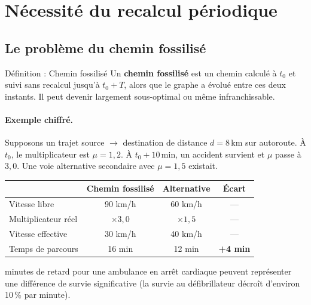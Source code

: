 \documentclass[12pt,a4paper]{article}
\theoremstyle{definition}
\theoremstyle{remark}
\begin{document}
\section{Nécessité du recalcul périodique}

\subsection{Le problème du chemin fossilisé}

\begin{defbox}{Définition : Chemin fossilisé}
  Un \textbf{chemin fossilisé} est un chemin calculé à $t_0$ et suivi
  sans recalcul jusqu'à $t_0 + T$, alors que le graphe a évolué entre
  ces deux instants. Il peut devenir largement sous-optimal ou même
  infranchissable.
\end{defbox}

\paragraph{Exemple chiffré.}
Supposons un trajet source $\to$ destination de distance $d = 8$\,km
sur autoroute. À $t_0$, le multiplicateur est $\mu = 1{,}2$.
À $t_0 + 10$\,min, un accident survient et $\mu$ passe à $3{,}0$.
Une voie alternative secondaire avec $\mu = 1{,}5$ existait.

\begin{center}
\begin{tabular}{lccc}
  \toprule
  & \textbf{Chemin fossilisé} & \textbf{Alternative} &
  \textbf{Écart} \\
  \midrule
  Vitesse libre & 90 km/h & 60 km/h & --- \\
  Multiplicateur réel & $\times 3{,}0$ & $\times 1{,}5$ & --- \\
  Vitesse effective & 30 km/h & 40 km/h & --- \\
  Temps de parcours & 16 min & 12 min & \textbf{+4 min} \\
  \bottomrule
\end{tabular}
\end{center}

 minutes de retard pour une ambulance en arrêt cardiaque peuvent
représenter une différence de survie significative (la survie au
défibrillateur décroît d'environ 10\,\% par minute).
\end{document}
